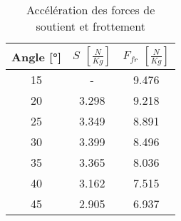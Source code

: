 \begin{table}
\centering
\begin{tabular}{|c|c|c|}
\hline
Angle [°] &$S$ $\left[ \frac{N}{Kg} \right]$ & $F_{fr}$ $\left[ \frac{N}{Kg} \right]$ \\
           \hline
15        &- & 9.476 \\
           \hline
20        &3.298 & 9.218 \\
           \hline
25        &3.349 & 8.891 \\
           \hline
30        &3.399 & 8.496 \\
           \hline
35        &3.365 & 8.036 \\
           \hline
40        &3.162 & 7.515 \\
           \hline
45        &2.905 & 6.937 \\
           \hline
\end{tabular}
\caption{Accélération des forces de soutient et frottement}
\label{table:v-abp}
\end{table}
